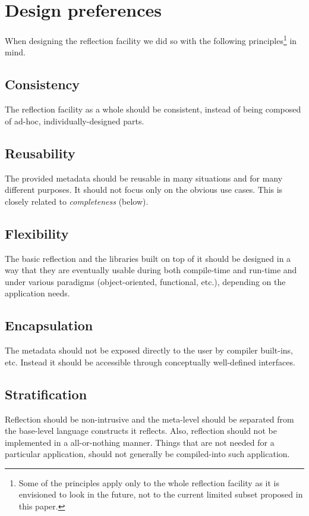 \section{Design preferences}

When designing the reflection facility we did so with
the following principles\footnote{Some of the principles
apply only to the whole reflection facility as it is envisioned
to look in the future, not to the current limited subset proposed
in this paper.} in mind.

\subsection{Consistency}

The reflection facility as a whole
should be consistent, instead of being composed of ad-hoc,
individually-designed parts.

\subsection{Reusability}

The provided metadata should be reusable
in many situations and for many different purposes. It should not focus only
on the obvious use cases. This is closely related to {\em completeness} (below).

\subsection{Flexibility}

The basic reflection and the libraries
built on top of it should be designed
in a way that they are eventually usable during both compile-time
and run-time and under various paradigms (object-oriented, functional, etc.),
depending on the application needs.

\subsection{Encapsulation}

The metadata should not be exposed directly to the user by compiler built-ins, etc.
Instead it should be accessible through conceptually well-defined interfaces.

\subsection{Stratification}

Reflection should be non-intrusive
and the meta-level should be separated from the base-level language
constructs it reflects. Also, reflection should not be implemented
in a all-or-nothing manner. Things that are not needed for a particular application,
should not generally be compiled-into such application.

